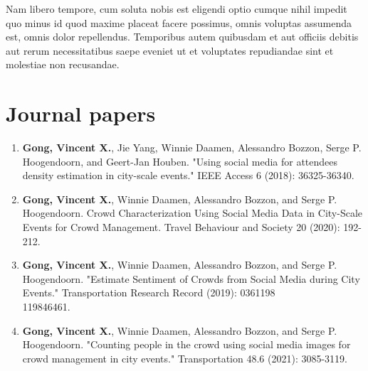 Nam libero tempore, cum soluta nobis est eligendi optio cumque nihil impedit quo minus id quod maxime placeat facere possimus, omnis voluptas assumenda est, omnis dolor repellendus. Temporibus autem quibusdam et aut officiis debitis aut rerum necessitatibus saepe eveniet ut et voluptates repudiandae sint et molestiae non recusandae.


\vspace*{\fill}
\pagebreak

\vspace*{0.60cm}

\section*{Journal papers}

\begin{enumerate}
  \item \textbf{Gong, Vincent X.}, Jie Yang, Winnie Daamen, Alessandro Bozzon, Serge P. Hoogendoorn, and Geert-Jan Houben. "Using social media for attendees density estimation in city-scale events." IEEE Access 6 (2018): 36325-36340.
  \item \textbf{Gong, Vincent X.}, Winnie Daamen, Alessandro Bozzon, and Serge P. Hoogendoorn. Crowd Characterization Using Social Media Data in City-Scale Events for Crowd Management. Travel Behaviour and Society 20 (2020): 192-212.
  \item \textbf{Gong, Vincent X.}, Winnie Daamen, Alessandro Bozzon, and Serge P. Hoogendoorn. "Estimate Sentiment of Crowds from Social Media during City Events." Transportation Research Record (2019): 0361198\\119846461.
  \item \textbf{Gong, Vincent X.}, Winnie Daamen, Alessandro Bozzon, and Serge P. Hoogendoorn. "Counting people in the crowd using social media images for crowd management in city events." Transportation 48.6 (2021): 3085-3119.
\end{enumerate}



